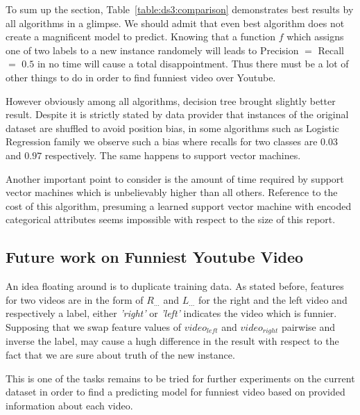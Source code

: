 To sum up the section, Table~\ref{table:ds3:comparison} demonstrates best
results by all algorithms in a glimpse. We should admit that even best algorithm does not create a
magnificent model to predict. Knowing that a function $f$ which assigns one of
two labels to a new instance randomely will leads to Precision $=$ Recall $=$
$0.5$ in no time will cause a total disappointment. Thus there must be a lot of
other things to do in order to find funniest video over Youtube. 

However
obviously among all algorithms, decision tree brought slightly better result.
Despite it is strictly stated by data provider that instances of the original
dataset are shuffled to avoid position bias, in some algorithms such as Logistic
Regression family we observe such a bias where recalls for two classes are
$0.03$ and $0.97$ respectively. The same happens to support vector machines.

Another important point to consider is the amount of time required by support
vector machines which is unbelievably higher than all others. Reference to the
cost of this algorithm, presuming a learned support vector machine with encoded
categorical attributes seems impossible with respect to the size of this report.

\subsection{Future work on Funniest Youtube Video}

An idea floating around is to duplicate training data. As stated before,
features for two videos are in the form of $R_{\ldots}$ and $L_{\ldots}$ for the
right and the left video and respectively a label, either {\it 'right'} or
{\it'left'} indicates the video which is funnier. Supposing that we swap
feature values of $video_{left}$ and $video_{right}$ pairwise and inverse the
label, may cause a hugh difference in the result with respect to the fact that
we are sure about truth of the new instance.

This is one of the tasks remains to be tried for further experiments on the
current dataset in order to find a predicting model for funniest video based on
provided information about each video.

